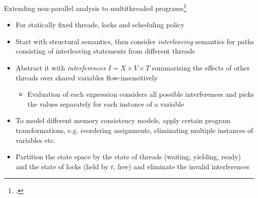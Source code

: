\documentclass[aspectratio=169,notes]{beamer}
\begin{document}
\begin{frame}{Extending non-parallel analysis to multithreaded programs\footcite{mine2011static}}
  \footnotesize
  \begin{itemize}[<+->]
  \item For statically fixed threads, locks and scheduling policy
  \item Start with structural semantics, then consider \emph{interleaving} semantics for paths consisting of interleaving statements from different threads
  \item Abstract it with \emph{interferences} $I = X \times V \times T$ summarizing the effects of other threads over shared variables flow-insensitively
    \begin{itemize}[<+->]\footnotesize
    \item Evaluation of each expression considers all possible interferences and picks the values separately for each instance of a variable
    \end{itemize}
  \item To model different memory consistency models, apply certain program transformations, e.g. reordering assignments, eliminating multiple instances of variables etc.
  \item Partition the state space by the state of threads (waiting, yielding, ready) and the state of locks (held by $t$, free) and eliminate the invalid interferences
  \end{itemize}
\end{frame}
\end{document}
